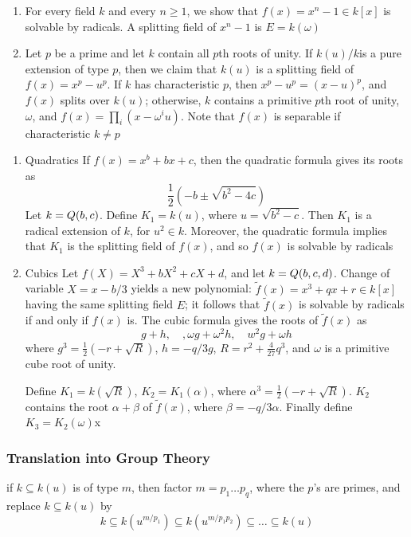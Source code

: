 \documentclass[11pt]{article}
\begin{document}
\begin{examplle}[]
\label{nexample3.15}
\begin{enumerate}
\item For every field \(k\) and every \(n\ge1\), we show that 
\(f(x)=x^n-1\in k[x]\) is solvable by radicals. A splitting field of
\(x^n-1\) is \(E=k(\omega)\)
\item Let \(p\) be a prime and let \(k\) contain all \(p\)th roots of unity. If
\(k(u)/k\)is a pure extension of type \(p\), then we claim that \(k(u)\) is
a splitting field of \(f(x)=x^p-u^p\). If \(k\) has characteristic \(p\),
then \(x^p-u^p=(x-u)^p\), and \(f(x)\) splits over \(k(u)\); otherwise,
\(k\) contains a primitive \(p\)th root of unity, \(\omega\), and
\(f(x)=\prod_i(x-\omega^iu)\). Note that \(f(x)\) is separable if
characteristic \(k\neq p\)
\end{enumerate}
\end{examplle}
\begin{enumerate}
\item Quadratics
\label{sec:orgd0e9034}
If \(f(x)=x^b+bx+c\), then the quadratic formula gives its roots as
\begin{equation*}
\frac{1}{2}(-b\pm\sqrt{b^2-4c})
\end{equation*}
Let \(k=\relax{Q}(b,c)\). Define \(K_1=k(u)\), where \(u=\sqrt{b^2-c}\). Then
\(K_1\) is a radical extension of \(k\), for \(u^2\in k\). Moreover, the
quadratic formula implies that \(K_1\) is the splitting field of \(f(x)\),
and so \(f(x)\) is solvable by radicals
\item Cubics
\label{sec:org747be0b}
Let \(f(X)=X^3+bX^2+cX+d\), and let \(k=\relax{Q}(b,c,d)\). Change of variable
\(X=x-b/3\) yields a new polynomial: \(\widetilde{f}(x)=x^3+qx+r\in k[x]\)
having the same splitting field \(E\); it follows that \(\widetilde{f}(x)\)
is solvable by radicals if and only if \(f(x)\) is. The cubic formula gives
the roots of \(\widetilde{f}(x)\) as
\begin{equation*}
g+h,\quad,\omega g+\omega^2h,\quad w^2g+\omega h
\end{equation*}
where \(g^3=\frac{1}{2}(-r+\sqrt{R})\), \(h=-q/3g\),
\(R=r^2+\frac{4}{27}q^3\), and \(\omega\) is a primitive cube root of unity.

Define \(K_1=k(\sqrt{R})\), \(K_2=K_1(\alpha)\), where
\(\alpha^3=\frac{1}{2}(-r+\sqrt{R})\). \(K_2\) contains the root
\(\alpha+\beta\) of \(\widetilde{f}(x)\), where \(\beta=-q/3\alpha\).
Finally define \(K_3=K_2(\omega)\)x
\end{enumerate}
\subsubsection{Translation into Group Theory}
\label{sec:org7c79606}
if \(k\subseteq k(u)\) is of type \(m\), then factor \(m=p_1\dots p_q\), where
the \(p\)'s are primes, and replace \(k\subseteq k(u)\) by
\begin{equation*}
k\subseteq k(u^{m/p_1})\subseteq k(u^{m/p_1p_2})\subseteq\dots\subseteq
k(u)
\end{equation*}
\end{document}
